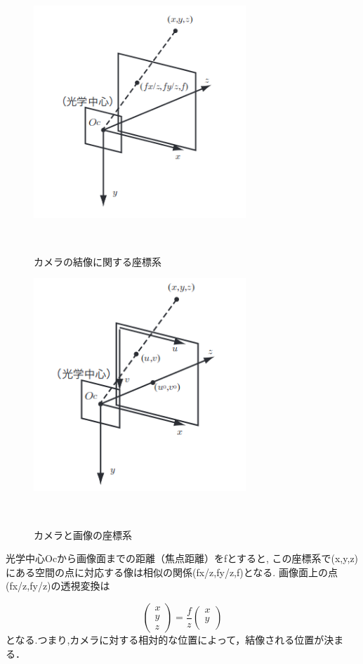 \documentclass[a4paper]{jarticle}
\begin{document}
\begin{figure}[b]
 \begin{center}
  \includegraphics[width=80mm]{image/camera1.png}
 　\caption{カメラの結像に関する座標系}%
 　\label{fig:02}%
 \end{center}
\end{figure}

\begin{figure}[b]
 \begin{center}
  \includegraphics[width=80mm]{image/camera2.png}
 　\caption{カメラと画像の座標系}%
 　\label{fig:02}%
 \end{center}
\end{figure}

光学中心Ocから画像面までの距離（焦点距離）をfとすると,
この座標系で(x,y,z)にある空間の点に対応する像は相似の関係(fx/z,fy/z,f)となる.
画像面上の点(fx/z,fy/z)の透視変換は

\begin{equation}
\left(
    \begin{array}{c}
      x \\
      y \\
      z 
    \end{array}
  \right)=\frac{f}{z} \left(
    \begin{array}{c}
      x \\
      y \\
       
    \end{array}
  \right)
\end{equation}
となる.つまり,カメラに対する相対的な位置によって，結像される位置が決まる．
\end{document}
